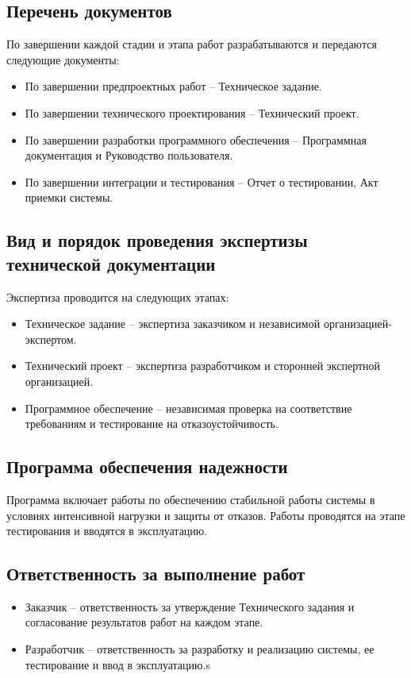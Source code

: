 \subsection{Перечень документов}
По завершении каждой стадии и этапа работ разрабатываются и передаются следующие документы:
\begin{itemize}
    \item По завершении предпроектных работ -- Техническое задание.
    \item По завершении технического проектирования -- Технический проект.
    \item По завершении разработки программного обеспечения -- Программная документация и Руководство пользователя.
    \item По завершении интеграции и тестирования -- Отчет о тестировании, Акт приемки системы.
\end{itemize}

\subsection{Вид и порядок проведения экспертизы технической документации}
Экспертиза проводится на следующих этапах:
\begin{itemize}
    \item Техническое задание -- экспертиза заказчиком и независимой организацией-экспертом.
    \item Технический проект -- экспертиза разработчиком и сторонней экспертной организацией.
    \item Программное обеспечение -- независимая проверка на соответствие требованиям и тестирование на отказоустойчивость.
\end{itemize}

\subsection{Программа обеспечения надежности}
Программа включает работы по обеспечению стабильной работы системы в условиях
интенсивной нагрузки и защиты от отказов. Работы проводятся на этапе
тестирования и вводятся в эксплуатацию.

\subsection{Ответственность за выполнение работ}
\begin{itemize}
    \item Заказчик -- ответственность за утверждение Технического задания и согласование результатов работ на каждом этапе.
    \item Разработчик -- ответственность за разработку и реализацию системы, ее тестирование и ввод в эксплуатацию.s
\end{itemize}

